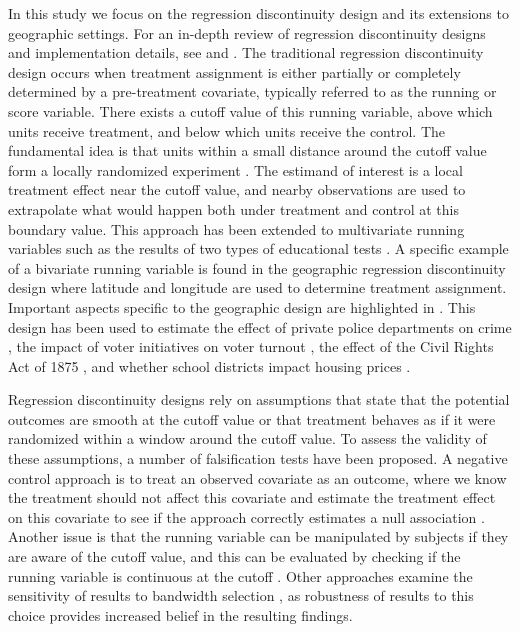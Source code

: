 \documentclass[a4paper,11pt]{article}
\begin{document}
In this study we focus on the regression discontinuity design and its extensions to geographic settings. For an in-depth review of regression discontinuity designs and implementation details, see \cite{imbens2008regression} and \cite{cattaneo2019regression}. The traditional regression discontinuity design occurs when treatment assignment is either partially or completely determined by a pre-treatment covariate, typically referred to as the running or score variable. There exists a cutoff value of this running variable, above which units receive treatment, and below which units receive the control. The fundamental idea is that units within a small distance around the cutoff value form a locally randomized experiment \citep{mattei2017regression}. The estimand of interest is a local treatment effect near the cutoff value, and nearby observations are used to extrapolate what would happen both under treatment and control at this boundary value. This approach has been extended to multivariate running variables such as the results of two types of educational tests \citep{matsudaira2008mandatory}. A specific example of a bivariate running variable is found in the geographic regression discontinuity design where latitude and longitude are used to determine treatment assignment. Important aspects specific to the geographic design are highlighted in \cite{keele2015geographic}. This design has been used to estimate the effect of private police departments on crime \citep{macdonald2016effect}, the impact of voter initiatives on voter turnout \citep{keele2015enhancing}, the effect of the Civil Rights Act of 1875 \citep{harvey2020applying}, and whether school districts impact housing prices \citep{rischard2020school}. 

Regression discontinuity designs rely on assumptions that state that the potential outcomes are smooth at the cutoff value or that treatment behaves as if it were randomized within a window around the cutoff value. To assess the validity of these assumptions, a number of falsification tests have been proposed. A negative control approach is to treat an observed covariate as an outcome, where we know the treatment should not affect this covariate and estimate the treatment effect on this covariate to see if the approach correctly estimates a null association \citep{lee2004voters}. Another issue is that the running variable can be manipulated by subjects if they are aware of the cutoff value, and this can be evaluated by checking if the running variable is continuous at the cutoff \citep{mccrary2008manipulation, cattaneo2017comparing}. Other approaches examine the sensitivity of results to bandwidth selection \citep{lemieux2008incentive}, as robustness of results to this choice provides increased belief in the resulting findings. 
\end{document}
